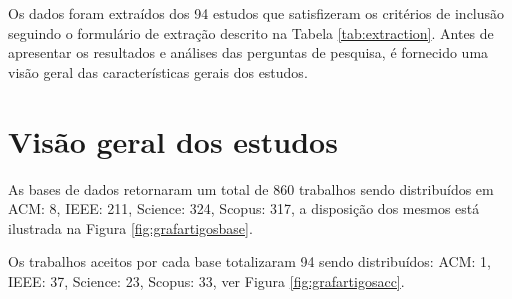 Os dados foram extraídos dos 94 estudos que satisfizeram os critérios de inclusão seguindo o formulário de extração descrito na Tabela \ref{tab:extraction}. Antes de apresentar os resultados e análises das perguntas de pesquisa, é fornecido uma visão geral das características gerais dos estudos.
\section{Visão geral dos estudos}

As bases de dados retornaram um total de 860 trabalhos sendo distribuídos em ACM: 8, IEEE: 211, Science: 324, Scopus: 317, a
disposição dos mesmos está ilustrada na Figura \ref{fig:grafartigosbase}.


\begin{figure}[h!] 
   	    \captionsetup{width=16cm}%
	\end{figure}
Os trabalhos aceitos por cada base totalizaram 94 sendo distribuídos: ACM: 1, IEEE: 37, Science: 23, Scopus: 33, ver Figura \ref{fig:grafartigosacc}.


